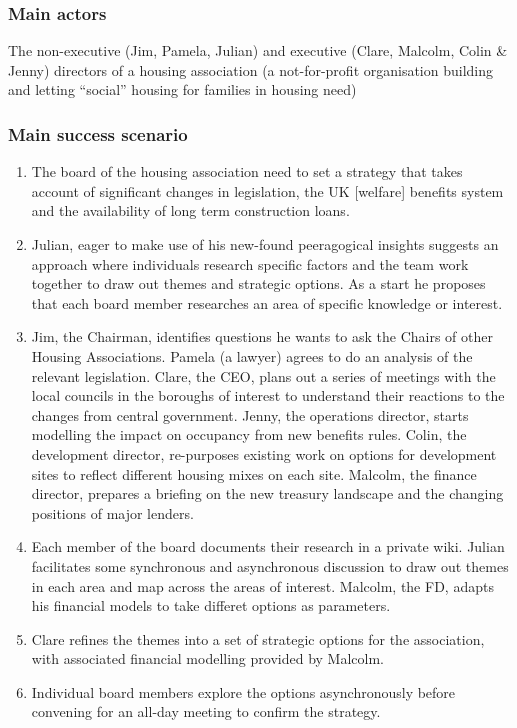 \subsubsection{Main actors}

The non-executive (Jim, Pamela, Julian) and executive (Clare, Malcolm,
Colin \& Jenny) directors of a housing association (a not-for-profit
organisation building and letting ``social'' housing for families in
housing need)

\subsubsection{Main success scenario}

\begin{enumerate}
\item
  The board of the housing association need to set a strategy that takes
  account of significant changes in legislation, the UK {[}welfare{]}
  benefits system and the availability of long term construction loans.
\item
  Julian, eager to make use of his new-found peeragogical insights
  suggests an approach where individuals research specific factors and
  the team work together to draw out themes and strategic options. As a
  start he proposes that each board member researches an area of
  specific knowledge or interest.
\item
  Jim, the Chairman, identifies questions he wants to ask the Chairs of
  other Housing Associations. Pamela (a lawyer) agrees to do an analysis
  of the relevant legislation. Clare, the CEO, plans out a series of
  meetings with the local councils in the boroughs of interest to
  understand their reactions to the changes from central government.
  Jenny, the operations director, starts modelling the impact on
  occupancy from new benefits rules. Colin, the development director,
  re-purposes existing work on options for development sites to reflect
  different housing mixes on each site. Malcolm, the finance director,
  prepares a briefing on the new treasury landscape and the changing
  positions of major lenders.
\item
  Each member of the board documents their research in a private wiki.
  Julian facilitates some synchronous and asynchronous discussion to
  draw out themes in each area and map across the areas of interest.
  Malcolm, the FD, adapts his financial models to take differet options
  as parameters.
\item
  Clare refines the themes into a set of strategic options for the
  association, with associated financial modelling provided by Malcolm.
\item
  Individual board members explore the options asynchronously before
  convening for an all-day meeting to confirm the strategy.
\end{enumerate}
